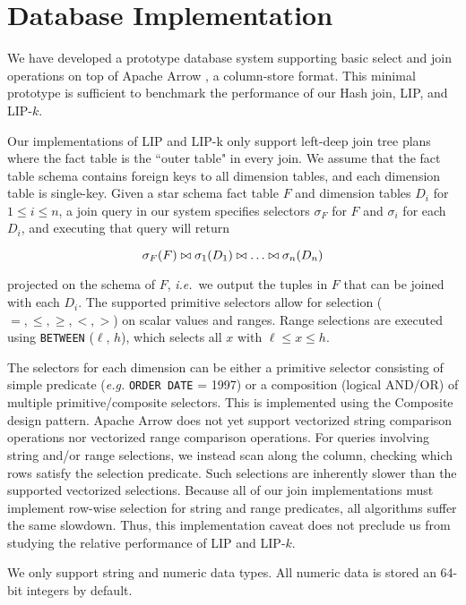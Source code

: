 

\section{Database Implementation}

We have developed a prototype database system supporting basic select and join operations on top of Apache Arrow \cite{apachearrow}, a column-store format. This minimal prototype is sufficient to benchmark the performance of our Hash join, LIP, and LIP-$k$.

Our implementations of LIP and LIP-k only support left-deep join tree plans where the fact table is the ``outer table" in every join. We assume that the fact table schema contains foreign keys to all dimension tables, and each dimension table is single-key. Given a star schema fact table $F$ and dimension tables $D_i$ for $1 \leq i \leq n$, a join query in our system specifies selectors $\sigma_F$ for $F$ and $\sigma_i$ for each $D_i$, and executing that query will return 

$$\sigma_F(F) \bowtie \sigma_1(D_1) \bowtie \dots \bowtie \sigma_n(D_n)$$

\noindent projected on the schema of $F$, {\it i.e.}~we output the tuples in $F$ that can be joined with each $D_i$. The supported primitive selectors allow for selection ($=, \leq, \geq, <, >$) on scalar values and ranges. Range selections are executed using \texttt{BETWEEN} ($\ell$, $h$), which selects all $x$ with $\ell \leq x \leq h$. 

The selectors for each dimension can be either a primitive selector consisting of simple predicate ({\it e.g.} \texttt{ORDER DATE} = 1997) 
or a composition (logical AND/OR) of multiple primitive/composite selectors. 
This is implemented using the Composite design pattern.
Apache Arrow does not yet support vectorized string comparison operations nor vectorized range comparison operations.
For queries involving string and/or range selections, 
we instead scan along the column, checking which rows satisfy the selection predicate. 
Such selections are inherently slower than the supported vectorized selections. 
Because all of our join implementations must implement row-wise selection for string and range predicates, 
all algorithms suffer the same slowdown. 
Thus, this implementation caveat does not preclude us from studying the relative performance of LIP and LIP-$k$.

We only support string and numeric data types. All numeric data is stored an 64-bit integers by default.

